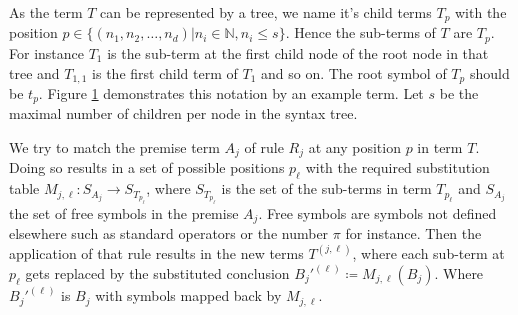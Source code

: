 \documentclass{scrartcl}
\theoremstyle{definition}
\begin{document}
\begin{figure}[!htbp]
	\centering
	
	\label{fig:sxntax_tree}
\end{figure}

As the term $T$ can be represented by a tree, we name it's child terms $T_p$ with the position $p \in \big\{\left( n_1, n_2, \dots, n_d \right) | n_i \in \mathbb{N}, n_i \leq s \big\}$.
Hence the sub-terms of $T$ are $T_p$.
For instance $T_1$ is the sub-term at the first child node of the root node in that tree and $T_{1,1}$ is the first child term of $T_1$ and so on.
The root symbol of $T_p$ should be $t_p$.
Figure \ref{fig:sxntax_tree} demonstrates this notation by an example term.
Let $s$ be the maximal number of children per node in the syntax tree.

We try to match the premise term $A_j$ of rule $R_j$ at any position $p$ in term $T$.
Doing so results in a set of possible positions $p_\ell$ with the required substitution table ${M_{j,\ell}: S_{A_j} \to S_{T_{p_\ell}}}$,
where $S_{T_{p_\ell}}$ is the set of the sub-terms in term $T_{p_\ell}$ and $S_{A_j}$ the set of free symbols in the premise $A_j$.
Free symbols are symbols not defined elsewhere such as standard operators or the number $\pi$ for instance.
Then the application of that rule results in the new terms $T^{(j,\ell)}$, where each sub-term at $p_\ell$ gets replaced by the substituted conclusion ${B_j'^{(\ell)} \coloneqq M_{j,\ell}\left( B_j \right)}$.
Where $B_j'^{(\ell)}$ is $B_j$ with symbols mapped back by $M_{j,\ell}$. 
\end{document}
